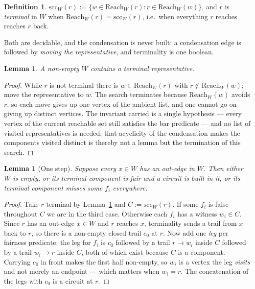 \documentclass[11pt,a4paper]{article}
\newtheorem{lemma}[theorem]{Lemma}
\theoremstyle{definition}
\newtheorem{definition}[theorem]{Definition}
\newcommand{\Reach}{\mathrm{Reach}}
\begin{document}
\begin{definition}
$\mathrm{scc}_W(r):=\{w\in\Reach_W(r): r\in\Reach_W(w)\}$, and $r$ is
\emph{terminal} in $W$ when $\Reach_W(r)=\mathrm{scc}_W(r)$, i.e.\ when
everything $r$ reaches reaches $r$ back.
\end{definition}

Both are decidable, and the condensation is never built: a condensation edge is
followed by \emph{moving the representative}, and terminality is one boolean.

\begin{lemma}\label{lem:findterm}
A non-empty $W$ contains a terminal representative.
\end{lemma}

\begin{proof}
While $r$ is not terminal there is $w\in\Reach_W(r)$ with $r\notin\Reach_W(w)$;
move the representative to $w$.  The search terminates because
$\Reach_W(w)$ avoids $r$, so each move gives up one vertex of the ambient list,
and one cannot go on giving up distinct vertices.  The invariant carried is a
single hypothesis --- every vertex of the current reachable set still satisfies
the bar predicate --- and no list of visited representatives is needed; that
acyclicity of the condensation makes the components visited distinct is thereby
not a lemma but the termination of this search.
\end{proof}

\begin{lemma}[One step]\label{lem:block}
Suppose every $x\in W$ has an out-edge in $W$.  Then either $W$ is empty, or
its terminal component is fair and a circuit is built in it, or its terminal
component misses some $f_i$ everywhere.
\end{lemma}

\begin{proof}
Take $r$ terminal by Lemma~\ref{lem:findterm} and $C:=\mathrm{scc}_W(r)$.  If
some $f_i$ is false throughout $C$ we are in the third case.  Otherwise each
$f_i$ has a witness $w_i\in C$.  Since $r$ has an out-edge $x\in W$ and $r$
reaches $x$, terminality sends a trail from $x$ back to $r$, so there is a
non-empty closed trail $c_0$ at $r$.  Now add one \emph{leg} per fairness
predicate: the leg for $f_i$ is $c_0$ followed by a trail $r\to w_i$ inside $C$
followed by a trail $w_i\to r$ inside $C$, both of which exist because $C$ is a
component.  Carrying $c_0$ in front makes the first half non-empty, so $w_i$ is
a vertex the leg \emph{visits} and not merely an endpoint --- which matters when
$w_i=r$.  The concatenation of the legs with $c_0$ is a circuit at $r$.
\end{proof}
\end{document}

